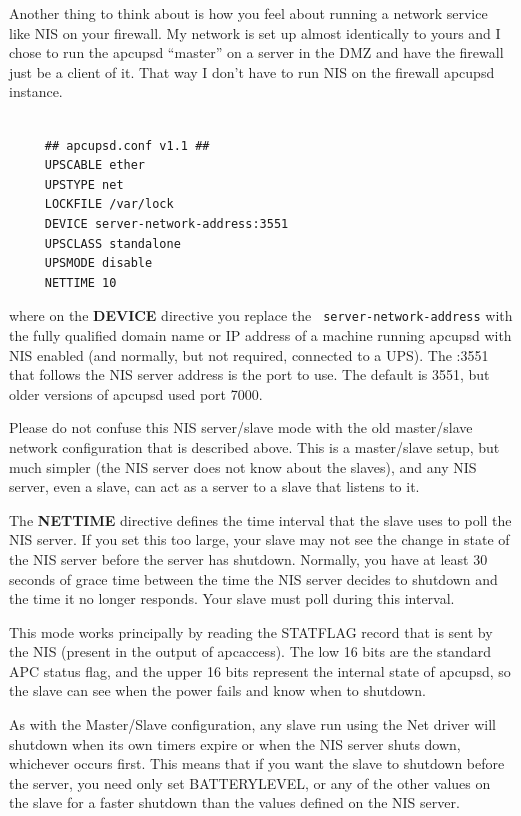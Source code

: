 {Another thing to think about is how you feel about running a network service
like NIS on your firewall. My network is set up almost identically to yours
and I chose to run the apcupsd ``master'' on a server in the DMZ and have the
firewall just be a client of it. That way I don't have to run NIS on the
firewall apcupsd instance. 

\footnotesize
\begin{verbatim}
     
     ## apcupsd.conf v1.1 ##
     UPSCABLE ether
     UPSTYPE net
     LOCKFILE /var/lock
     DEVICE server-network-address:3551
     UPSCLASS standalone
     UPSMODE disable
     NETTIME 10
\end{verbatim}
\normalsize

where on the {\bf DEVICE} directive you replace the {\tt
server-network-address} with the fully qualified domain name or IP address of
a machine running apcupsd with NIS enabled (and normally, but not required,
connected to a UPS). The :3551 that follows the NIS server address is the port
to use. The default is 3551, but older versions of apcupsd used port 7000.  

Please do not confuse this NIS server/slave mode with the old master/slave
network configuration that is described above.  This is a master/slave setup,
but much simpler (the NIS server does not know about the slaves), and any NIS
server, even a slave, can act as a server to a slave that listens to it.  

The {\bf NETTIME} directive defines the time interval that the slave uses to
poll the NIS server. If you set this too large, your slave may not see the
change in state of the NIS server before the server has shutdown. Normally,
you have at least 30 seconds of grace time between the time the NIS server
decides to shutdown and the time it no longer responds. Your slave must poll
during this interval.  

This mode works principally by reading the STATFLAG record that is sent by the
NIS (present in the output of apcaccess). The low 16 bits are the standard APC
status flag, and the upper 16 bits represent the internal state of apcupsd, so
the slave can see when the power fails and know when to shutdown.  

As with the Master/Slave configuration, any slave run using the Net driver
will shutdown when its own timers expire or when the NIS server shuts down,
whichever occurs first. This means that if you want the slave to shutdown
before the server, you need only set BATTERYLEVEL, or any of the other values
on the slave for a faster shutdown than the values defined on the NIS server. 

}
